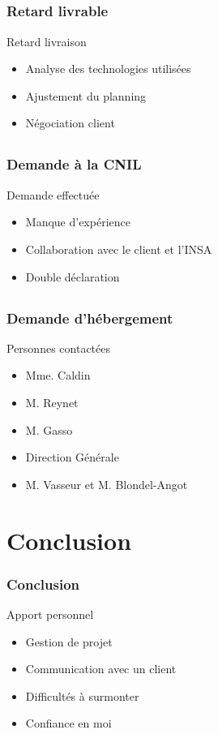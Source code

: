 \documentclass[compress,xcolor=dvipsnames]{beamer}
\begin{document}
\subsection{}
\begin{frame}
\frametitle{Retard livrable}
\begin{block}{Retard livraison}
\begin{itemize}
	\item Analyse des technologies utilisées
	\item Ajustement du planning
	\item Négociation client
\end{itemize}
\end{block}
\end{frame}


\subsection{}
\begin{frame}
\frametitle{Demande à la CNIL}
\begin{block}{Demande effectuée}
\begin{itemize}
	\item Manque d’expérience
	\item Collaboration avec le client et l'INSA
	\item Double déclaration
\end{itemize}
\end{block}
\end{frame}


\subsection{}
\begin{frame}
\frametitle{Demande d'hébergement}
\begin{block}{Personnes contactées}
\begin{itemize}
	\item Mme. Caldin
	\item M. Reynet
	\item M. Gasso
	\item Direction Générale
	\item M. Vasseur et M. Blondel-Angot
\end{itemize}
\end{block}
\end{frame}



\section{Conclusion}
\begin{frame}
\frametitle{Conclusion}
\begin{block}{Apport personnel}
\begin{itemize}
	\item Gestion de projet
	\item Communication avec un client
	\item Difficultés à surmonter
	\item Confiance en moi
\end{itemize}
\end{block}
\end{frame}
\end{document}
